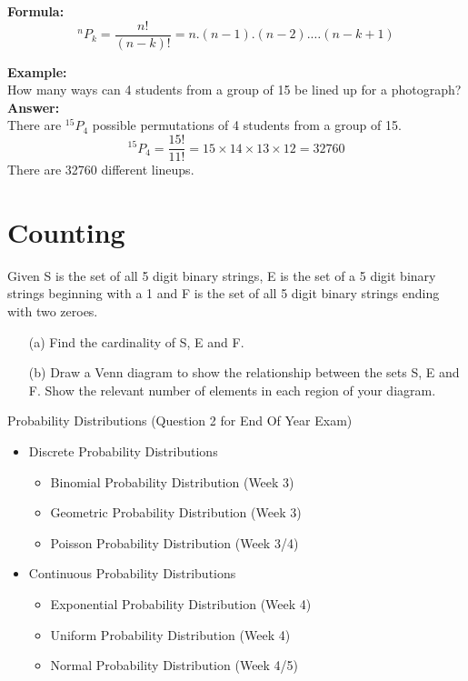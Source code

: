 \documentclass[12pt]{report}
\begin{document}
		\bigskip
		\textbf{Formula:}	
		\[ ^nP_k = \frac{n!}{(n-k)!} =  n.(n-1).(n-2).\ldots(n-k+1) \]
		
		
		
		\textbf{Example:}\\	
		How many ways can 4 students from a group of 15 be lined up for a photograph?\\
		\bigskip
		\textbf{Answer:	}\\
		There are $^{15}P_4$ possible permutations of 4 students from a group of 15.
		\[ ^{15}P_4 = \frac{15!}{11!} = 15\times 14\times 13\times 12 = 32760 \]
		There are 32760 different lineups.
		
	
\section{Counting}
Given S is the set of all 5 digit binary strings, E is the set of a 5 digit
binary strings beginning with a 1 and F is the set of all 5 digit binary strings ending
with two zeroes.
\begin{itemize}
	\item[(a)] Find the cardinality of S, E and F.
	\item[(b)] Draw a Venn diagram to show the relationship between the sets S, E and F.
	Show the relevant number of elements in each region of your diagram.
\end{itemize}

{\LARGE
	Probability Distributions (Question 2 for End Of Year Exam)
	\begin{itemize}
		\item Discrete Probability Distributions
		\begin{itemize}
			\item Binomial Probability Distribution (Week 3)
			\item Geometric Probability Distribution (Week 3)
			\item Poisson Probability Distribution (Week 3/4)
		\end{itemize}
		
		\item Continuous Probability Distributions
		\begin{itemize}
			\item Exponential Probability Distribution (Week 4)
			\item Uniform Probability Distribution (Week 4)
			\item Normal Probability Distribution (Week 4/5)
		\end{itemize}
	\end{itemize}
}
\end{document}
